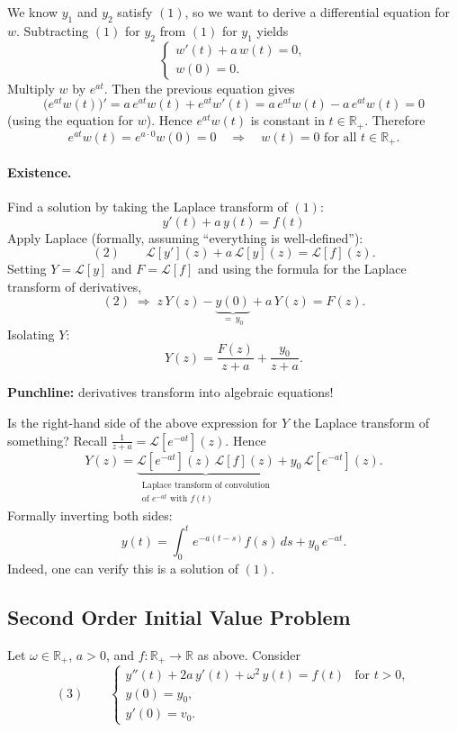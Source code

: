 We know $y_1$ and $y_2$ satisfy $(1)$, so we want to derive a differential equation for $w$. Subtracting $(1)$ for $y_2$ from $(1)$ for $y_1$ yields
\[
\begin{cases}
w'(t) + a\,w(t) = 0, \\
w(0) = 0.
\end{cases}
\]
Multiply $w$ by $e^{at}$. Then the previous equation gives
\[
\bigl(e^{at} w(t)\bigr)' = a\,e^{at} w(t) + e^{at} w'(t)
= a\,e^{at} w(t) - a\,e^{at} w(t) = 0
\]
(using the equation for $w$). Hence $e^{at} w(t)$ is constant in $t \in \mathbb{R}_+$. Therefore
\[
e^{at} w(t) = e^{a \cdot 0} w(0) = 0 \quad\Longrightarrow\quad w(t) = 0 \text{ for all } t \in \mathbb{R}_+.
\]

\paragraph{Existence.}
Find a solution by taking the Laplace transform of $(1)$:
\[
y'(t) + a\,y(t) = f(t)
\]
Apply Laplace (formally, assuming ``everything is well-defined''):
\[
(2) \qquad \mathcal{L}[y'](z) + a\,\mathcal{L}[y](z) = \mathcal{L}[f](z).
\]
Setting $Y = \mathcal{L}[y]$ and $F = \mathcal{L}[f]$ and using the formula for the Laplace transform of derivatives,
\[
(2) \;\Longrightarrow\; z\,Y(z) - \underbrace{y(0)}_{=\,y_0} + a\,Y(z) = F(z).
\]
Isolating $Y$:
\[
Y(z) = \frac{F(z)}{z + a} + \frac{y_0}{z + a}.
\]

\textbf{Punchline:} derivatives transform into algebraic equations!

Is the right-hand side of the above expression for $Y$ the Laplace transform of something? Recall $\tfrac{1}{z + a} = \mathcal{L}[e^{-at}](z)$. Hence
\[
Y(z) = \underbrace{\mathcal{L}[e^{-at}](z)\,\mathcal{L}[f](z)}_{\substack{\text{Laplace transform of convolution}\\ \text{of } e^{-at} \text{ with } f(t)}} + y_0\,\mathcal{L}[e^{-at}](z).
\]
Formally inverting both sides:
\[
\boxed{y(t) = \int_0^t e^{-a(t - s)} f(s)\,ds + y_0\,e^{-at}.}
\]
Indeed, one can verify this is a solution of $(1)$.

\subsection{Second Order Initial Value Problem}

Let $\omega \in \mathbb{R}_+$, $a > 0$, and $f : \mathbb{R}_+ \to \mathbb{R}$ as above. Consider
\[
(3) \qquad
\begin{cases}
y''(t) + 2a\,y'(t) + \omega^2\,y(t) = f(t) & \text{for } t > 0, \\
y(0) = y_0, \\
y'(0) = v_0.
\end{cases}
\]

